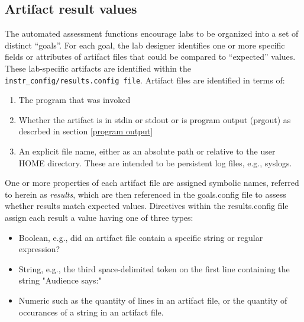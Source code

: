 \documentclass[12pt]{article}
\begin{document}
\subsection{Artifact result values}
\label{results.config}
The automated assessment functions encourage labs to be organized into a set of distinct ``goals''.
For each goal, the lab designer identifies one or more specific fields or attributes of artifact files that
could be compared to ``expected'' values.  These lab-specific artifacts are identified within the
\texttt{instr\_config/results.config file}.  Artifact files are identified in terms of:
\begin{enumerate}
\item The program that was invoked
\item Whether the artifact is in stdin or stdout or is program output (prgout) as descrbed in section \ref{program output}
\item An explicit file name, either as an absolute path or relative to the user HOME directory.  These are intended
to be persistent log files, e.g., syslogs.
\end{enumerate}

One or more properties of each artifact file are assigned symbolic names, referred to herein as \textit{results}, which 
are then referenced in the goals.config file to assess whether results match expected values.  Directives within the
results.config file assign each result a value having one of three types:
\begin{itemize}
\item Boolean, e.g., did an artifact file contain a specific string or regular expression?
\item String, e.g., the third space-delimited token on the first line containing the string "Audience says:"
\item Numeric such as the quantity of lines in an artifact file, or the quantity of occurances of a string in an artifact file.
\end{itemize} 
\end{document}
